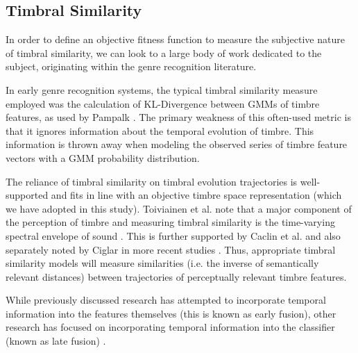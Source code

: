 \documentclass[12pt]{report} 	%
\numberwithin{figure}{chapter}
\numberwithin{table}{chapter}
\numberwithin{equation}{chapter}
\begin{document}
\begin{flushleft}
\subsection{Timbral Similarity}

In order to define an objective fitness function to measure the subjective nature of timbral similarity, we can look to a large body of work dedicated to the subject, originating within the genre recognition literature.

In early genre recognition systems, the typical timbral similarity measure employed was the calculation of KL-Divergence between GMMs of timbre features, as used by Pampalk \cite{Pampalk:2006pr}. The primary weakness of this often-used metric is that it ignores information about the temporal evolution of timbre. This information is thrown away when modeling the observed series of timbre feature vectors with a GMM probability distribution. 

The reliance of timbral similarity on timbral evolution trajectories is well-supported and fits in line with an objective timbre space representation (which we have adopted in this study). Toiviainen et al. note that a major component of the perception of timbre and measuring timbral similarity is the time-varying spectral envelope of sound \cite[p.225]{Toiviainen:1998hs}. This is further supported by Caclin et al. and also separately noted by Ciglar in more recent studies \cite[p. 1]{Caclin:2005il} \cite[p. 4]{Ciglar:2009uf}. Thus, appropriate timbral similarity models will measure similarities (i.e. the inverse of semantically relevant distances) between trajectories of perceptually relevant timbre features. 

While previously discussed research has attempted to incorporate temporal information into the features themselves (this is known as early fusion), other research has focused on incorporating temporal information into the classifier (known as late fusion) \cite[p. 500]{Meng:2005fx}.


\end{flushleft}
\end{document}
